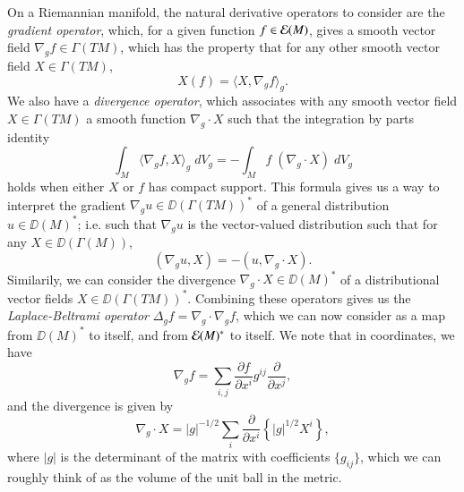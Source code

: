 On a Riemannian manifold, the natural derivative operators to consider are the \emph{gradient operator}, which, for a given function $f \in \operatorname{\mathcal{E}}(M)$, gives a smooth vector field $\nabla_g f \in \Gamma(TM)$, which has the property that for any other smooth vector field $X \in \Gamma(TM)$,
%
\[ X(f) = \langle X, \nabla_g f \rangle_g. \]
%
We also have a \emph{divergence operator}, which associates with any smooth vector field $X \in \Gamma(TM)$ a smooth function $\nabla_g \cdot X$ such that the integration by parts identity
%
\[ \int_M \big\langle \nabla_g f, X \big\rangle_g\; dV_g = - \int_M f\; (\nabla_g \cdot X)\; dV_g \]
%
holds when either $X$ or $f$ has compact support. This formula gives us a way to interpret the gradient $\nabla_g u \in \DD(\Gamma(TM))^*$ of a general distribution $u \in \DD(M)^*$; i.e. such that $\nabla_g u$ is the vector-valued distribution such that for any $X \in \DD(\Gamma(M))$,
%
\[ ( \nabla_g u, X ) = - ( u, \nabla_g \cdot X ). \]
%
Similarily, we can consider the divergence $\nabla_g \cdot X \in \DD(M)^*$ of a distributional vector fields $X \in \DD(\Gamma(TM))^*$. Combining these operators gives us the \emph{Laplace-Beltrami operator} $\Delta_g f = \nabla_g \cdot \nabla_g f$, which we can now consider as a map from $\DD(M)^*$ to itself, and from $\operatorname{\mathcal{E}}(M)^*$ to itself. We note that in coordinates, we have
%
\[ \nabla_g f = \sum_{i,j} \frac{\partial f}{\partial x^i} g^{ij} \frac{\partial}{\partial x^j}, \]
%
and the divergence is given by
%
\[ \nabla_g \cdot X = |g|^{-1/2} \sum_i \frac{\partial}{\partial x^i} \left\{ |g|^{1/2} X^i \right\}, \]
%
where $|g|$ is the determinant of the matrix with coefficients $\{ g_{ij} \}$, which we can roughly think of as the volume of the unit ball in the metric.

